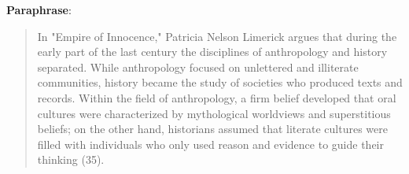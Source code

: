 \textbf{Paraphrase}:
\begin{quote}
In "Empire of Innocence," Patricia Nelson Limerick argues that during the early part of the last century the disciplines of anthropology and history separated. While anthropology focused on unlettered and illiterate communities, history became the study of societies who produced texts and records. Within the field of anthropology, a firm belief developed that oral cultures were characterized by mythological worldviews and superstitious beliefs; on the other hand, historians assumed that literate cultures were filled with individuals who only used reason and evidence to guide their thinking (35).
\end{quote}


